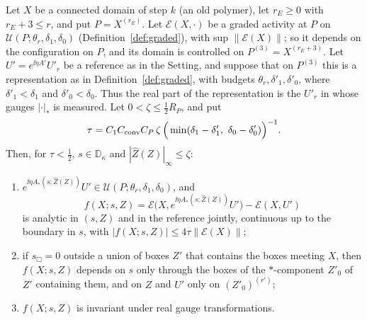 \begin{proposition}\label{prop:composed}
Let $X$ be a connected domain of step $k$ (an old polymer), let $r_E\ge0$ with $r_E+3\le r$, and put $P=X^{(r_E)}$. Let $\mathcal E(X,\cdot)$ be a graded activity at $P$ on $\mathcal U(P;\theta_r,\delta_1,\delta_0)$ (Definition~\ref{def:graded}), with sup $\|\mathcal E(X)\|$; so it depends on the configuration on $P$, and its domain is controlled on $P^{(3)}=X^{(r_E+3)}$. Let $U'=e^{\ii\eta A'}U'_r$ be a reference as in the Setting, and suppose that on $P^{(3)}$ this is a representation as in Definition~\ref{def:graded}, with budgets $\theta_r,\delta'_1,\delta'_0$, where $\delta'_1<\delta_1$ and $\delta'_0<\delta_0$. Thus the real part of the representation is the $U'_r$ in whose gauges $|\cdot|_*$ is measured. Let $0<\zeta\le\frac12R_P$, and put
\[
\tau=C_1C_{\rm conv}C_P\,\zeta\,\Big(\min(\delta_1-\delta'_1,\ \delta_0-\delta'_0)\Big)^{-1}.
\]
Then, for $\tau<\frac12$, $s\in\mathbb D_\kappa$ and $|\hat Z(Z)|_\infty\le\zeta$:
\begin{enumerate}[label=(\alph*)]
\item $e^{\ii\eta A_*(s;\hat Z(Z))}U'\in\mathcal U(P;\theta_r,\delta_1,\delta_0)$, and
\[
f(X;s,Z)=\mathcal E\big(X,e^{\ii\eta A_*(s;\hat Z(Z))}U'\big)-\mathcal E(X,U')
\]
is analytic in $(s,Z)$ and in the reference jointly, continuous up to the boundary in $s$, with $|f(X;s,Z)|\le4\tau\|\mathcal E(X)\|$;
\item if $s_\Box=0$ outside a union of boxes $Z'$ that contains the boxes meeting $X$, then $f(X;s,Z)$ depends on $s$ only through the boxes of the $*$-component $Z'_0$ of $Z'$ containing them, and on $Z$ and $U'$ only on $(Z'_0)^{(r')}$;
\item $f(X;s,Z)$ is invariant under real gauge transformations.
\end{enumerate}
\end{proposition}

